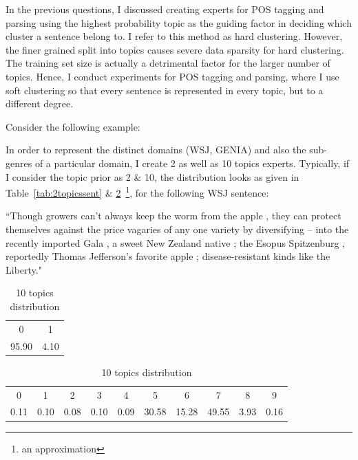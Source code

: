 In the previous questions, I discussed creating experts for POS tagging and parsing using the highest probability topic as the guiding factor in deciding which cluster a sentence belong to. I refer to this method as hard clustering. However, the finer grained split into topics causes severe data sparsity for hard clustering. The training set size is actually a detrimental factor for the larger number of topics. Hence, I conduct experiments for POS tagging and parsing, where I use soft clustering so that every sentence is represented in every topic, but to a different degree. 

Consider the following example:

In order to represent the distinct domains (WSJ, GENIA) and also the sub-genres of a particular domain, I create 2 as well as 10 topics experts. Typically, if I consider the topic prior as 2 \& 10, the distribution looks as given in Table~\ref{tab:2topicssent} \& \ref{tab:10topicssent}~\footnote{an approximation}, for the following WSJ sentence:

``Though growers can't always keep the worm from the apple , they can protect themselves against the price vagaries of any one variety by diversifying -- into the recently imported Gala , a sweet New Zealand native ; the Esopus Spitzenburg , reportedly Thomas Jefferson's favorite apple ; disease-resistant kinds like the Liberty."
 
\begin{table}[!htb]
\centering

\caption{2 topics distribution}
\begin{tabular}{cc}
\\ \hline
0 & 1 \\
95.90 & 4.10 \\ \hline
\end{tabular}
\label{tab:2topicssent}

\caption{10 topics distribution
}
\begin{tabular}{cccccccccc}
\\ \hline

0 & \multicolumn{1}{c}{1} & \multicolumn{1}{c}{2} & \multicolumn{1}{c}{3} & \multicolumn{1}{c}{4} & \multicolumn{1}{c}{5} & \multicolumn{1}{c}{6} & \multicolumn{1}{c}{7} & \multicolumn{1}{c}{8} & \multicolumn{1}{c}{9} \\
0.11 & 0.10 & 0.08 & 0.10 & 0.09 & 30.58 & 15.28 & 49.55 & 3.93 & 0.16 \\ \hline
\end{tabular}
\label{tab:10topicssent}

\end{table}
 
